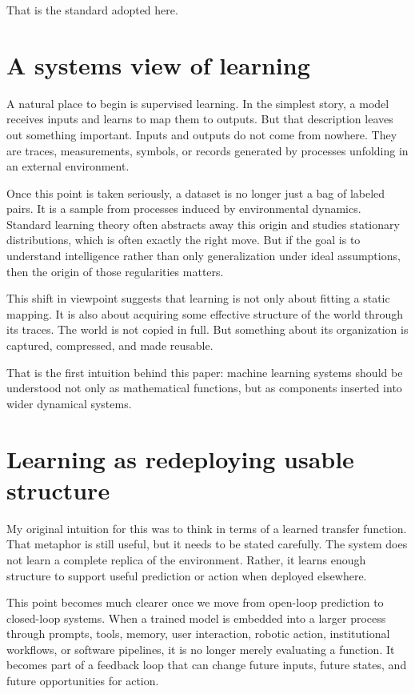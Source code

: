 \documentclass[11pt]{article}
\begin{document}
That is the standard adopted here.

\section{A systems view of learning}


A natural place to begin is supervised learning. In the simplest story, a model receives inputs and learns to map them to outputs. But that description leaves out something important. Inputs and outputs do not come from nowhere. They are traces, measurements, symbols, or records generated by processes unfolding in an external environment.

Once this point is taken seriously, a dataset is no longer just a bag of labeled pairs. It is a sample from processes induced by environmental dynamics. Standard learning theory often abstracts away this origin and studies stationary distributions, which is often exactly the right move. But if the goal is to understand intelligence rather than only generalization under ideal assumptions, then the origin of those regularities matters.

This shift in viewpoint suggests that learning is not only about fitting a static mapping. It is also about acquiring some effective structure of the world through its traces. The world is not copied in full. But something about its organization is captured, compressed, and made reusable.

That is the first intuition behind this paper: machine learning systems should be understood not only as mathematical functions, but as components inserted into wider dynamical systems.

\section{Learning as redeploying usable structure}


My original intuition for this was to think in terms of a learned transfer function. That metaphor is still useful, but it needs to be stated carefully. The system does not learn a complete replica of the environment. Rather, it learns enough structure to support useful prediction or action when deployed elsewhere.

This point becomes much clearer once we move from open-loop prediction to closed-loop systems. When a trained model is embedded into a larger process through prompts, tools, memory, user interaction, robotic action, institutional workflows, or software pipelines, it is no longer merely evaluating a function. It becomes part of a feedback loop that can change future inputs, future states, and future opportunities for action.
\end{document}
